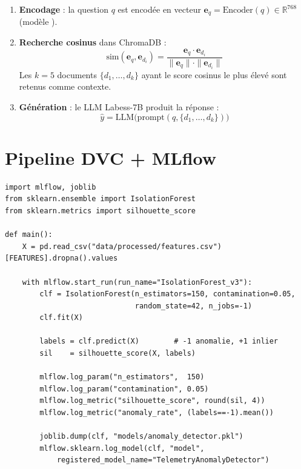 \begin{enumerate}
  \item \textbf{Encodage} : la question $q$ est encodée en vecteur
        $\mathbf{e}_q = \text{Encoder}(q) \in \mathbb{R}^{768}$
        (modèle ).

  \item \textbf{Recherche cosinus} dans ChromaDB :
        \begin{equation}
        \text{sim}(\mathbf{e}_q, \mathbf{e}_{d_i})
        = \frac{\mathbf{e}_q \cdot \mathbf{e}_{d_i}}
               {\|\mathbf{e}_q\| \cdot \|\mathbf{e}_{d_i}\|}
        \label{eq:cosine}
        \end{equation}
        Les $k=5$ documents $\{d_1, \ldots, d_k\}$ ayant le score cosinus le plus
        élevé sont retenus comme contexte.

  \item \textbf{Génération} : le LLM Labess-7B produit la réponse :
        \begin{equation}
        \hat{y} = \text{LLM}\bigl(\text{prompt}(q, \{d_1, \ldots, d_k\})\bigr)
        \label{eq:rag_gen}
        \end{equation}
\end{enumerate}

\section{Pipeline DVC + MLflow}

\begin{lstlisting}[style=pythonstyle,
  caption={train\_anomaly.py — Pipeline MLflow + IsolationForest},
  label={lst:train_anomaly_ch5}]
import mlflow, joblib
from sklearn.ensemble import IsolationForest
from sklearn.metrics import silhouette_score

def main():
    X = pd.read_csv("data/processed/features.csv")[FEATURES].dropna().values

    with mlflow.start_run(run_name="IsolationForest_v3"):
        clf = IsolationForest(n_estimators=150, contamination=0.05,
                              random_state=42, n_jobs=-1)
        clf.fit(X)

        labels = clf.predict(X)        # -1 anomalie, +1 inlier
        sil    = silhouette_score(X, labels)

        mlflow.log_param("n_estimators",  150)
        mlflow.log_param("contamination", 0.05)
        mlflow.log_metric("silhouette_score", round(sil, 4))
        mlflow.log_metric("anomaly_rate", (labels==-1).mean())

        joblib.dump(clf, "models/anomaly_detector.pkl")
        mlflow.sklearn.log_model(clf, "model",
            registered_model_name="TelemetryAnomalyDetector")
\end{lstlisting}

